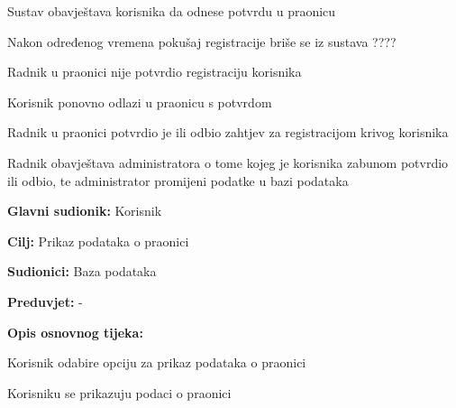 \begin{packed_item}
\begin{packed_item}
\begin{packed_enum}
			\item Sustav obavještava korisnika da odnese potvrdu u praonicu
			\item Nakon određenog vremena pokušaj registracije briše se iz sustava ????
			
		\end{packed_enum}
		
		\item[5.a] Radnik u praonici nije potvrdio registraciju korisnika
		\item[] \begin{packed_enum}
			
			\item Korisnik ponovno odlazi u praonicu s potvrdom
			
		\end{packed_enum}
		
		\item[5.a] Radnik u praonici potvrdio je ili odbio zahtjev za registracijom krivog korisnika
		\item[] \begin{packed_enum}
			
			\item Radnik obavještava administratora o tome kojeg je korisnika zabunom potvrdio ili odbio, te administrator promijeni podatke u bazi podataka
			
		\end{packed_enum}
		
		
	\end{packed_item}	
\end{packed_item}

\noindent {}
\begin{packed_item}
	
	\item \textbf{Glavni sudionik: } Korisnik
	\item  \textbf{Cilj:} Prikaz podataka o praonici
	\item  \textbf{Sudionici:} Baza podataka
	\item  \textbf{Preduvjet:} -
	\item  \textbf{Opis osnovnog tijeka:}
	
	\item[] \begin{packed_enum}
		
		\item Korisnik odabire opciju za prikaz podataka o praonici
		\item Korisniku se prikazuju podaci o praonici
		
	\end{packed_enum}
	
\end{packed_item}

